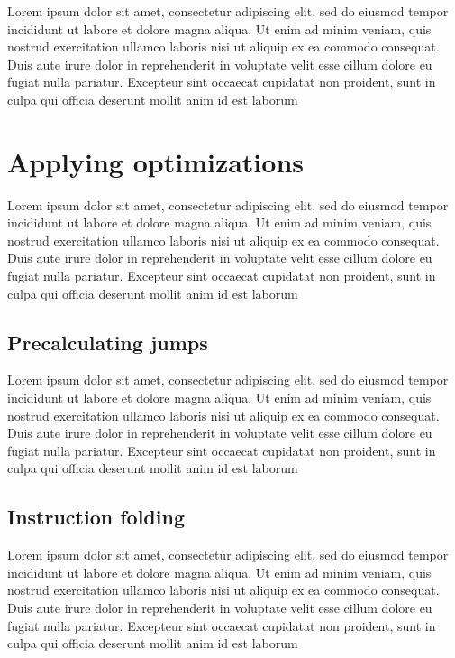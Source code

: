 \par Lorem ipsum dolor sit amet, consectetur adipiscing elit, sed do eiusmod tempor incididunt ut labore et dolore magna aliqua. Ut enim ad minim veniam, quis nostrud exercitation ullamco laboris nisi ut aliquip ex ea commodo consequat. Duis aute irure dolor in reprehenderit in voluptate velit esse cillum dolore eu fugiat nulla pariatur. Excepteur sint occaecat cupidatat non proident, sunt in culpa qui officia deserunt mollit anim id est laborum

\section{Applying optimizations}
\label{sec:ch2sec3}

\par Lorem ipsum dolor sit amet, consectetur adipiscing elit, sed do eiusmod tempor incididunt ut labore et dolore magna aliqua. Ut enim ad minim veniam, quis nostrud exercitation ullamco laboris nisi ut aliquip ex ea commodo consequat. Duis aute irure dolor in reprehenderit in voluptate velit esse cillum dolore eu fugiat nulla pariatur. Excepteur sint occaecat cupidatat non proident, sunt in culpa qui officia deserunt mollit anim id est laborum

\subsection{Precalculating jumps}
\label{subsec:ch2sec3sec1}

\par Lorem ipsum dolor sit amet, consectetur adipiscing elit, sed do eiusmod tempor incididunt ut labore et dolore magna aliqua. Ut enim ad minim veniam, quis nostrud exercitation ullamco laboris nisi ut aliquip ex ea commodo consequat. Duis aute irure dolor in reprehenderit in voluptate velit esse cillum dolore eu fugiat nulla pariatur. Excepteur sint occaecat cupidatat non proident, sunt in culpa qui officia deserunt mollit anim id est laborum

\subsection{Instruction folding}
\label{subsec:ch2sec3sec2}

\par Lorem ipsum dolor sit amet, consectetur adipiscing elit, sed do eiusmod tempor incididunt ut labore et dolore magna aliqua. Ut enim ad minim veniam, quis nostrud exercitation ullamco laboris nisi ut aliquip ex ea commodo consequat. Duis aute irure dolor in reprehenderit in voluptate velit esse cillum dolore eu fugiat nulla pariatur. Excepteur sint occaecat cupidatat non proident, sunt in culpa qui officia deserunt mollit anim id est laborum

